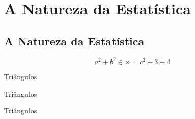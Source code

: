 \documentclass[]{livroabertoem}
\author{Tarso Boudet Caldas \and Tarso Caldas}
\begin{document}
\frontmatter

\tableofcontents

\mainmatter
\chapter{A Natureza da Estatística}

\taskintoc

\begin{teacherintroduction}
\lipsum[2]

\begin{habilities}
\end{habilities}

\begin{habilities}[EF]
\end{habilities}

\lipsum[3-5]

\end{teacherintroduction}

\section{A Natureza da Estatística}

\lipsum[1-3]


\lipsum[1]
\[
    a^2 + b^2 \in \times = c^2 + 3 + 4
\]

\begin{task}{Triângulos}
\begin{teacher}
  \lipsum[12]
  \lipsum[13]
  \lipsum[13]
\end{teacher}

\lipsum[2]
\end{task}

\lipsum[3]


\begin{example}{Triângulos}
  \lipsum[4]
\end{example}

\newpage

\begin{knowledge}
  \lipsum[6]
\end{knowledge}

\begin{observation}{Triângulos}
  \lipsum[5]
\end{observation}
\begin{reflection}
  \lipsum[6]
\end{reflection}
\end{document}
